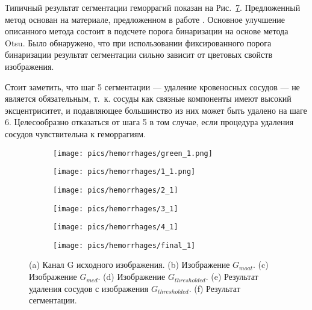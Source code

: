 \documentclass[12pt,fleqn]{article}
\begin{document}
Типичный результат сегментации геморрагий показан на Рис.~\ref{fig:hem1}. Предложенный метод основан на материале, предложенном в работе \cite{jose}. Основное улучшение описанного метода состоит в подсчете порога бинаризации на основе метода Otsu. Было обнаружено, что при использовании фиксированного порога бинаризации результат сегментации сильно зависит от цветовых свойств изображения.

Стоит заметить, что шаг 5 сегментации --- удаление кровеносных сосудов --- не является обязательным, т.~к. сосуды как связные компоненты имеют высокий эксцентриситет, и подавляющее большинство из них может быть удалено на шаге 6. Целесообразно отказаться от шага 5 в том случае, если процедура удаления сосудов чувствительна к геморрагиям.

\begin{figure}[t]
	\centering
	\begin{subfigure}[b]{.31\textwidth}
		\texttt{[image: pics/hemorrhages/green\_1.png]}
		\caption{}
		\label{fig:moat_a}
	\end{subfigure}
	\hfill
	\begin{subfigure}[b]{.31\textwidth}
		\texttt{[image: pics/hemorrhages/1\_1.png]}
		\caption{}
		\label{fig:moat_b}
	\end{subfigure}
	\hfill
	\begin{subfigure}[b]{.31\textwidth}
		\centering
		\texttt{[image: pics/hemorrhages/2\_1]}
		\caption{}
		\label{fig:hem2_1}
	\end{subfigure}
	
	\begin{subfigure}[b]{.31\textwidth}
		\centering
		\texttt{[image: pics/hemorrhages/3\_1]}
		\caption{}
		\label{fig:hem3_1}
	\end{subfigure}
	\hfill
	\begin{subfigure}[b]{.31\textwidth}
		\centering
		\texttt{[image: pics/hemorrhages/4\_1]}
		\caption{}
		\label{fig:hem4_1}
	\end{subfigure}
	\hfill
	\begin{subfigure}[b]{.31\textwidth}
		\centering
		\texttt{[image: pics/hemorrhages/final\_1]}
		\caption{}
		\label{fig:hem_final_1}
	\end{subfigure}
	
	\caption{(a) Канал G исходного изображения. 
		(b) Изображение $G_{moat}$. 
		(c) Изображение $G_{med}$.
		(d) Изображение $G_{thresholded}$.
		(e) Результат удаления сосудов с изображения $G_{thresholded}$.
		(f) Результат сегментации.}
	\label{fig:hem1}
\end{figure}
\end{document}
